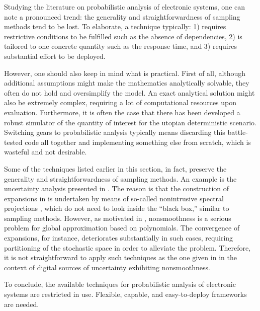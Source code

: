 Studying the literature on probabilistic analysis of electronic systems, one can
note a pronounced trend: the generality and straightforwardness of sampling
methods tend to be lost. To elaborate, a technique typically: 1) requires
restrictive conditions to be fulfilled such as the absence of dependencies, 2)
is tailored to one concrete quantity such as the response time, and 3) requires
substantial effort to be deployed.

However, one should also keep in mind what is practical. First of all, although
additional assumptions might make the mathematics analytically solvable, they
often do not hold and oversimplify the model. An exact analytical solution might
also be extremely complex, requiring a lot of computational resources upon
evaluation. Furthermore, it is often the case that there has been developed a
robust simulator of the quantity of interest for the utopian deterministic
scenario. Switching gears to probabilistic analysis typically means discarding
this battle-tested code all together and implementing something else from
scratch, which is wasteful and not desirable.

Some of the techniques listed earlier in this section, in fact, preserve the
generality and straightforwardness of sampling methods. An example is the
uncertainty analysis presented in \cite{ukhov2015}. The reason is that the
construction of  expansions in \cite{ukhov2015} is undertaken by means of
so-called nonintrusive spectral projections \cite{xiu2010}, which do not need to
look inside the ``black box,'' similar to sampling methods. However, as
motivated in , nonsmoothness is a serious problem for global
approximation based on polynomials. The convergence of  expansions, for
instance, deteriorates substantially in such cases, requiring partitioning of
the stochastic space in order to alleviate the problem. Therefore, it is not
straightforward to apply such techniques as the one given in \cite{ukhov2015} in
the context of digital sources of uncertainty exhibiting nonsmoothness.

To conclude, the available techniques for probabilistic analysis of electronic
systems are restricted in use. Flexible, capable, and easy-to-deploy frameworks
are needed.
